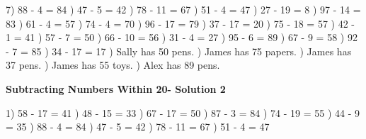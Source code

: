 \documentclass{article}%
\begin{document}
7) 88 {-} 4 = 84%
) 47 {-} 5 = 42%
) 78 {-} 11 = 67%
) 51 {-} 4 = 47%
) 27 {-} 19 = 8%
) 97 {-} 14 = 83%
) 61 {-} 4 = 57%
) 74 {-} 4 = 70%
) 96 {-} 17 = 79%
) 37 {-} 17 = 20%
) 75 {-} 18 = 57%
) 42 {-} 1 = 41%
) 57 {-} 7 = 50%
) 66 {-} 10 = 56%
) 31 {-} 4 = 27%
) 95 {-} 6 = 89%
) 67 {-} 9 = 58%
) 92 {-} 7 = 85%
) 34 {-} 17 = 17%
) Sally has 50 pens.%
) James has 75 papers.%
) James has 37 pens.%
) James has 55 toys.%
) Alex has 89 pens.%
\newline%
\newpage%
\large%
\begin{center}%
\textbf{Subtracting Numbers Within 20- Solution 2}%
\newline%
\end{center} \normalsize%
1) 58 {-} 17 = 41%
) 48 {-} 15 = 33%
) 67 {-} 17 = 50%
) 87 {-} 3 = 84%
) 74 {-} 19 = 55%
) 44 {-} 9 = 35%
) 88 {-} 4 = 84%
) 47 {-} 5 = 42%
) 78 {-} 11 = 67%
) 51 {-} 4 = 47%
\newline%
\end{document}
